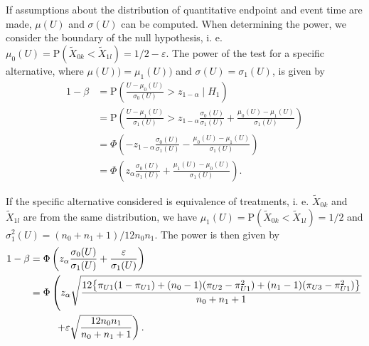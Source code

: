 \documentclass[bimj,fleqn]{w-art}\usepackage[]{graphicx}\usepackage[]{color}
\theoremstyle{plain}
\theoremstyle{definition}
\begin{document}
  If assumptions about the distribution of quantitative endpoint and event time
	are made, $\mu(U)$ and $\sigma(U)$ can be computed. When determining the power,
	we consider the boundary of the null hypothesis, i. e.
  $\mu_0(U) = \text{P}(\widetilde{X}_{0k} < \widetilde{X}_{1l}) = 1/2 - \varepsilon$.
  The power of the test for a specific alternative, where $\mu(U)) = \mu_1(U))$
  and $\sigma(U) = \sigma_1(U)$, is given by
  \begin{align*}
    1 - \beta &= \text{P} \left(\frac{U - \mu_0(U)}{\sigma_0(U)}  >
                                   z_{1-\alpha} \mid H_1 \right) \\
              &= \text{P} \left(\frac{U - \mu_1(U)}{\sigma_1(U)}  >
                                   z_{1-\alpha}\frac{\sigma_0(U)}{\sigma_1(U)} +
                                   \frac{\mu_0(U) - \mu_1(U)}{\sigma_1(U)} \right) \\
              &= \Phi\left(- z_{1-\alpha}\frac{\sigma_0(U)}{\sigma_1(U)} -
                              \frac{\mu_0(U) - \mu_1(U)}{\sigma_1(U)} \right) \\
              &= \Phi\left(z_{\alpha}\frac{\sigma_0(U)}{\sigma_1(U)} +
                              \frac{\mu_1(U) - \mu_0(U)}{\sigma_1(U)} \right) .
  \end{align*}

  If the specific alternative considered is equivalence of treatments, i. e.
  $\widetilde{X}_{0k}$ and $\widetilde{X}_{1l}$ are from the same distribution,
  we have $\mu_1(U) = \text{P}(\widetilde{X}_{0k} < \widetilde{X}_{1l}) = 1/2$
  and $\sigma^2_1(U) = (n_0 + n_1 +1) /12 n_0 n_1$. The power is
  then given by
  \begin{align*}
  1 - \beta &= \Phi\left(z_{\alpha}\frac{\sigma_0(U)}{\sigma_1(U)} +
                              \frac{\varepsilon}{\sigma_1(U)} \right) \\
            &= \Phi\left(z_{\alpha} \sqrt{\frac{12 \big\{ \pi_{U1} (1 - \pi_{U1}) +
                                    (n_0 - 1) (\pi_{U2} - \pi_{U1}^2) +
                                    (n_1 - 1) (\pi_{U3} - \pi_{U1}^2) \big\}}{n_0 + n_1 +1}} \right.\\
            &{\hphantom{= \Phi\bigg(}} \left. + \varepsilon \sqrt{\frac{12 n_0 n_1 }{n_0 + n_1 +1}} \right) .
  \end{align*}
\end{document}
